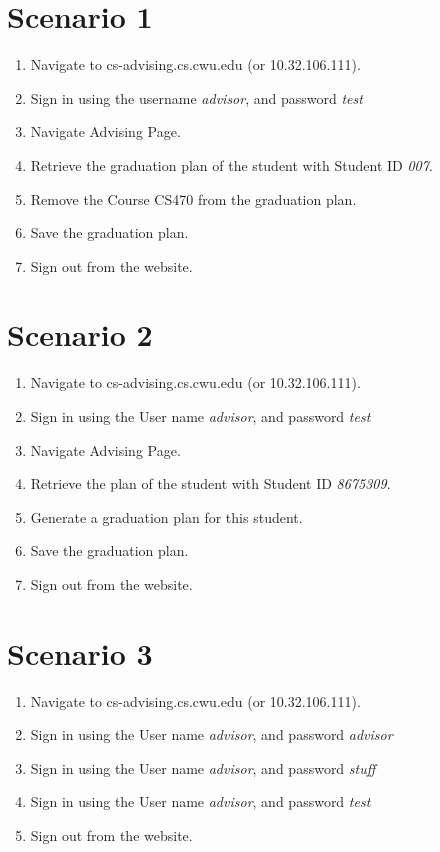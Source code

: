 \documentclass{article}
\begin{document}
\section{Scenario 1}
\begin{enumerate}
\item Navigate to cs-advising.cs.cwu.edu (or 10.32.106.111).
\item Sign in using the username \textit{advisor}, and password \textit{test}
\item Navigate Advising Page.
\item Retrieve the graduation plan of the student with Student ID \textit{007}.
\item Remove the Course CS470 from the graduation plan.
\item Save the graduation plan.
\item Sign out from the website.
\end{enumerate}
\section{Scenario 2}
\begin{enumerate}
\item Navigate to cs-advising.cs.cwu.edu (or 10.32.106.111).
\item Sign in using the User name \textit{advisor}, and password \textit{test}
\item Navigate Advising Page.
\item Retrieve the plan of the student with Student ID \textit{8675309}.
\item Generate a graduation plan for this student.
\item Save the graduation plan.
\item Sign out from the website.
\end{enumerate}
\section{Scenario 3}
\begin{enumerate}
\item Navigate to cs-advising.cs.cwu.edu (or 10.32.106.111).
\item Sign in using the User name \textit{advisor}, and password \textit{advisor}
\item Sign in using the User name \textit{advisor}, and password \textit{stuff}
\item Sign in using the User name \textit{advisor}, and password \textit{test}
\item Sign out from the website.
\end{enumerate}
\end{document}
